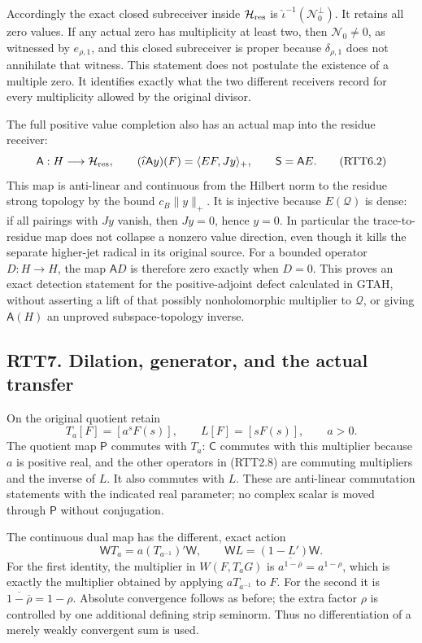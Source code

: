 Accordingly the exact closed subreceiver inside \(\mathcal H_{\rm res}\)
is \(\widehat\iota^{-1}(\mathcal N_0^\perp)\). It retains all zero
values. If any actual zero has multiplicity at least two, then
\(\mathcal N_0\ne0\), as witnessed by \(e_{\rho,1}\), and this closed
subreceiver is proper because \(\delta_{\rho,1}\) does not annihilate
that witness. This statement does not postulate the existence of a
multiple zero. It identifies exactly what the two different receivers
record for every multiplicity allowed by the original divisor.

The full positive value completion also has an actual map into the
residue receiver: \[
\mathsf A:H\longrightarrow\mathcal H_{\rm res},\qquad
(\widehat\iota\mathsf A y)(F)=\langle EF,Jy\rangle_+,
\qquad \mathsf S=\mathsf A E.
\tag{RTT6.2}
\] This map is anti-linear and continuous from the Hilbert norm to the
residue strong topology by the bound \(c_B\|y\|_+\). It is injective
because \(E(\mathcal Q)\) is dense: if all pairings with \(Jy\) vanish,
then \(Jy=0\), hence \(y=0\). In particular the trace-to-residue map
does not collapse a nonzero value direction, even though it kills the
separate higher-jet radical in its original source. For a bounded
operator \(D:H\to H\), the map \(\mathsf A D\) is therefore zero exactly
when \(D=0\). This proves an exact detection statement for the
positive-adjoint defect calculated in GTAH, without asserting a lift of
that possibly nonholomorphic multiplier to \(\mathcal Q\), or giving
\(\mathsf A(H)\) an unproved subspace-topology inverse.

\subsection{RTT7. Dilation, generator, and the actual
transfer}\label{rtt7.-dilation-generator-and-the-actual-transfer}

On the original quotient retain \[
T_a[F]=[a^sF(s)],\qquad L[F]=[sF(s)],\qquad a>0.
\tag{RTT7.1}
\] The quotient map \(\mathsf P\) commutes with \(T_a\): \(\mathsf C\)
commutes with this multiplier because \(a\) is positive real, and the
other operators in (RTT2.8) are commuting multipliers and the inverse of
\(L\). It also commutes with \(L\). These are anti-linear commutation
statements with the indicated real parameter; no complex scalar is moved
through \(\mathsf P\) without conjugation.

The continuous dual map has the different, exact action \[
\boxed{\mathsf W T_a=a(T_{a^{-1}})'\mathsf W,
\qquad \mathsf W L=(1-L')\mathsf W.}
\tag{RTT7.2}
\] For the first identity, the multiplier in \(W(F,T_aG)\) is
\(\overline{a^{1-\overline\rho}}=a^{1-\rho}\), which is exactly the
multiplier obtained by applying \(aT_{a^{-1}}\) to \(F\). For the second
it is \(\overline{1-\overline\rho}=1-\rho\). Absolute convergence
follows as before; the extra factor \(\rho\) is controlled by one
additional defining strip seminorm. Thus no differentiation of a merely
weakly convergent sum is used.

